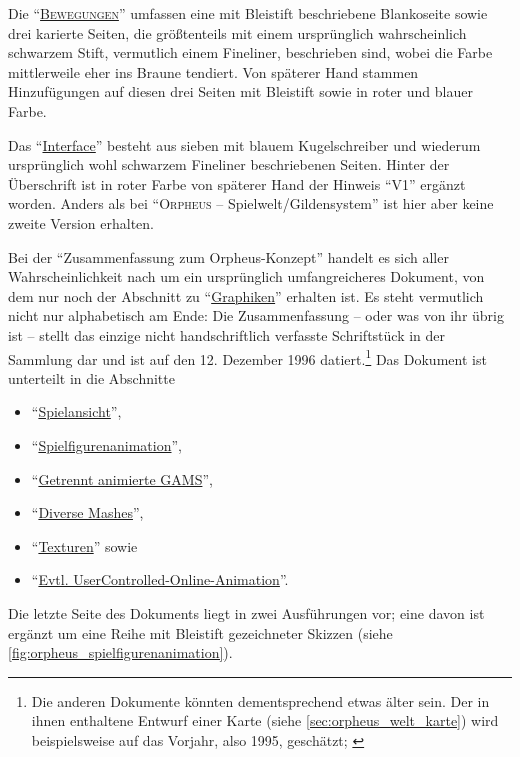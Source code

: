 \documentclass[a5paper,pagesize,numbers=noenddot]{scrbook}
\begin{document}
Die \enquote{\uline{\textsc{Bewegungen}}} umfassen eine mit Bleistift beschriebene Blankoseite sowie drei karierte Seiten, die größtenteils mit einem ursprünglich wahrscheinlich schwarzem Stift, vermutlich einem Fineliner, beschrieben sind, wobei die Farbe mittlerweile eher ins Braune tendiert.
Von späterer Hand stammen Hinzufügungen auf diesen drei Seiten mit Bleistift sowie in roter und blauer Farbe.

Das \enquote{\uline{Interface}} besteht aus sieben mit blauem Kugelschreiber und wiederum ursprünglich wohl schwarzem Fineliner beschriebenen Seiten.
Hinter der Überschrift ist in roter Farbe von späterer Hand der Hinweis \enquote{V1} ergänzt worden.
Anders als bei \enquote{\textsc{Orpheus} -- Spielwelt/Gildensystem} ist hier aber keine zweite Version erhalten.

Bei der \enquote{Zusammenfassung zum Orpheus-Konzept} handelt es sich aller Wahrscheinlichkeit nach um ein ursprünglich umfangreicheres Dokument, von dem nur noch der Abschnitt zu \enquote{\uline{Graphiken}} erhalten ist.\autocite[Vgl.][]{archive_orpheus_2024}
Es steht vermutlich nicht nur alphabetisch am Ende:
Die Zusammenfassung -- oder was von ihr übrig ist -- stellt das einzige nicht handschriftlich verfasste Schriftstück in der Sammlung dar und ist auf den 12. Dezember 1996 datiert.\footnote{Die anderen Dokumente könnten dementsprechend etwas älter sein.
Der in ihnen enthaltene Entwurf einer Karte (siehe \autoref{sec:orpheus_welt_karte}) wird beispielsweise auf das Vorjahr, also 1995, geschätzt; \autocite[vgl.][]{flosha_evolution_2024}}
Das Dokument ist unterteilt in die Abschnitte

\begin{itemize}
   \item \enquote{\uline{Spielansicht}},
   \item \enquote{\uline{Spielfigurenanimation}},
   \item \enquote{\uline{Getrennt animierte GAMS}},
   \item \enquote{\uline{Diverse Mashes}},
   \item \enquote{\uline{Texturen}} sowie
   \item \enquote{\uline{Evtl. User\-Controlled-Online-Animation}}.
\end{itemize}

\noindent Die letzte Seite des Dokuments liegt in zwei Ausführungen vor; eine davon ist ergänzt um eine Reihe mit Bleistift gezeichneter Skizzen (siehe \autoref{fig:orpheus_spielfigurenanimation}).
\end{document}
